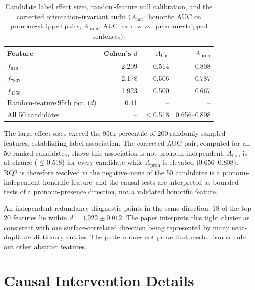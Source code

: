 \documentclass[10pt]{article}
\begin{document}
\begin{table}[H]
\centering
\small
\setlength\tabcolsep{4pt}
\begin{tabular}{lrrr}
\toprule
\textbf{Feature} & \textbf{Cohen's $d$} & $A_{\mathrm{hon}}$ & $A_{\mathrm{pron}}$ \\
\midrule
$f_{646}$ & 2.209 & 0.514 & 0.808 \\
$f_{7832}$ & 2.178 & 0.506 & 0.787 \\
$f_{4358}$ & 1.923 & 0.500 & 0.667 \\
\midrule
Random-feature 95th pct. ($d$) & 0.41 & -- & -- \\
All 50 candidates & -- & $\leq$0.518 & 0.656--0.808 \\
\bottomrule
\end{tabular}
\caption{Candidate label effect sizes, random-feature null calibration, and the
corrected orientation-invariant audit ($A_{\mathrm{hon}}$: honorific AUC on
pronoun-stripped pairs; $A_{\mathrm{pron}}$: AUC for raw vs.\ pronoun-stripped
sentences).}
\label{tab:features}
\end{table}

The large effect sizes exceed the 95th percentile of 200 randomly sampled
features, establishing label association. The corrected AUC pair, computed for
all 50 ranked candidates, shows this association is not pronoun-independent:
$A_{\mathrm{hon}}$ is at chance ($\leq0.518$) for every candidate while
$A_{\mathrm{pron}}$ is elevated ($0.656$--$0.808$). RQ2 is therefore resolved in
the negative--none of the 50 candidates is a pronoun-independent honorific
feature--and the causal tests are interpreted as bounded tests of a
pronoun-presence direction, not a validated honorific feature.

An independent redundancy diagnostic points in the same direction: 18 of the
top 20 features lie within $d=1.922\pm0.012$. The paper interprets this tight
cluster as consistent with one surface-correlated direction being represented
by many near-duplicate dictionary entries. The pattern does not prove that
mechanism or rule out other abstract features.
\FloatBarrier

\section{Causal Intervention Details}
\end{document}
